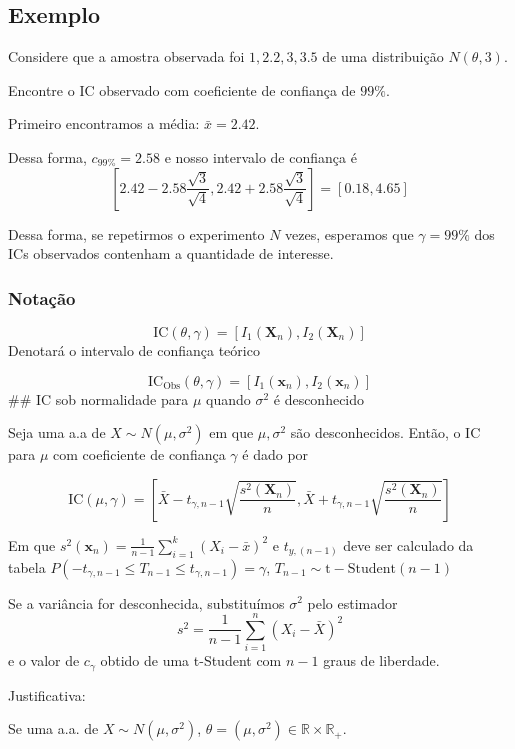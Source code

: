\documentclass[
  letterpaper,
  DIV=11,
  numbers=noendperiod]{scrreprt}
\begin{document}
\subsection{Exemplo}\label{exemplo-5}

Considere que a amostra observada foi \(1, 2.2, 3, 3.5\) de uma
distribuição \(N(\theta, 3)\).

Encontre o IC observado com coeficiente de confiança de \(99\%\).

Primeiro encontramos a média: \(\bar{x} = 2.42\).

Dessa forma, \(c_{99\%} = 2.58\) e nosso intervalo de confiança é \[
\left[2.42 - 2.58 \frac{\sqrt{3}}{\sqrt{4}}, 2.42 + 2.58\frac{\sqrt{3}}{\sqrt{4}}\right] = [0.18, 4.65]
\]

Dessa forma, se repetirmos o experimento \(N\) vezes, esperamos que
\(\gamma = 99\%\) dos ICs observados contenham a quantidade de
interesse.

\subsubsection{Notação}\label{notauxe7uxe3o}

\[
\mathrm{IC}(\theta, \gamma) = [I_{1} (\pmb{X}_{n}), I_{2} (\pmb{X}_{n})]
\] Denotará o intervalo de confiança teórico

\[
\mathrm{IC}_{\mathrm{Obs}}(\theta, \gamma) = [I_{1} (\pmb{x}_{n}), I_{2} (\pmb{x}_{n})]
\] \#\# IC sob normalidade para \(\mu\) quando \(\sigma^2\) é
desconhecido

Seja uma a.a de \(X\sim N(\mu, \sigma^2)\) em que \(\mu, \sigma^2\) são
desconhecidos. Então, o IC para \(\mu\) com coeficiente de confiança
\(\gamma\) é dado por

\[
\mathrm{IC}(\mu,\gamma) = \left[\bar{X} - t_{\gamma, n-1} \sqrt{\frac{s^2 (\pmb{X}_{n})}{n}}, \bar{X} +t_{\gamma, n-1}
\sqrt{\frac{s^2 (\pmb{X}_{n})}{n}}\right]
\]

Em que
\(s^2 (\pmb{x}_{n}) = \frac{1}{n-1}\sum^{k}_{i=1}(X_i - \bar{x})^2\) e
\(t_{y,(n-1)}\) deve ser calculado da tabela
\(P(-t_{\gamma, n-1} \leq T_{n-1} \leq t_{\gamma, n-1}) = \gamma\),
\(T_{n-1} \sim \mathrm{t-Student}(n-1)\)

Se a variância for desconhecida, substituímos \(\sigma^2\) pelo
estimador \[
s^2 = \frac{1}{n-1}\sum\limits^{n}_{i=1} (X_{i} - \bar{X})^2
\] e o valor de \(c_{\gamma}\) obtido de uma t-Student com \(n-1\) graus
de liberdade.

Justificativa:

Se uma a.a. de \(X\sim N(\mu,\sigma^2)\),
\(\theta = (\mu, \sigma^2) \in \mathbb{R} \times\mathbb{R_{+}}\).
\end{document}
